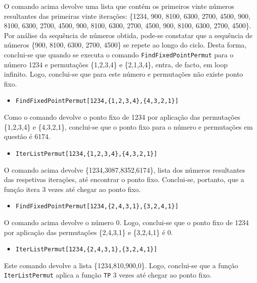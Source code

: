 \documentclass[12pt,a4paper]{article}
\begin{document}
        O comando acima devolve uma lista que contém os primeiros vinte números resultantes das primeiras vinte iterações: \{1234, 900, 8100, 6300, 2700, 4500, 900, 8100, 6300, 2700, 4500, 900, 8100, 6300, 2700, 4500, 900, 8100, 6300, 2700, 4500\}. Por análise da sequência de números obtida, pode-se constatar que a sequência de números \{900, 8100, 6300, 2700, 4500\} se repete ao longo do ciclo. Desta forma, conclui-se que quando se executa o comando \texttt{FindFixedPointPermut} para o número 1234 e permutações \{1,2,3,4\} e \{2,1,3,4\}, entra, de facto, em loop infinito. Logo, conclui-se que para este número e permutações não existe ponto fixo.

        \begin{itemize}
            \item \texttt{FindFixedPointPermut[1234,\{1,2,3,4\},\{4,3,2,1\}]}
        \end{itemize}

        Como o comando devolve o ponto fixo de 1234 por aplicação das permutações \{1,2,3,4\} e \{4,3,2,1\}, conclui-se que o ponto fixo para o número e permutações em questão é 6174.

        \begin{itemize}
            \item \texttt{IterListPermut[1234,\{1,2,3,4\},\{4,3,2,1\}]}
        \end{itemize}

        O comando acima devolve \{1234,3087,8352,6174\}, lista dos números resultantes das respetivas iterações, até encontrar o ponto fixo. Conclui-se, portanto, que a função itera 3 vezes até chegar ao ponto fixo.

        \begin{itemize}
            \item \texttt{FindFixedPointPermut[1234,\{2,4,3,1\},\{3,2,4,1\}]}
        \end{itemize}

        O comando acima devolve o número 0. Logo, conclui-se que o ponto fixo de 1234 por aplicação das permutações \{2,4,3,1\} e \{3,2,4,1\} é 0.

        \begin{itemize}
            \item \texttt{IterListPermut[1234,\{2,4,3,1\},\{3,2,4,1\}]}
        \end{itemize}

        Este comando devolve a lista \{1234,810,900,0\}. Logo, conclui-se que a função \texttt{IterListPermut} aplica a função \texttt{TP} 3 vezes até chegar ao ponto fixo.
    
\end{document}
